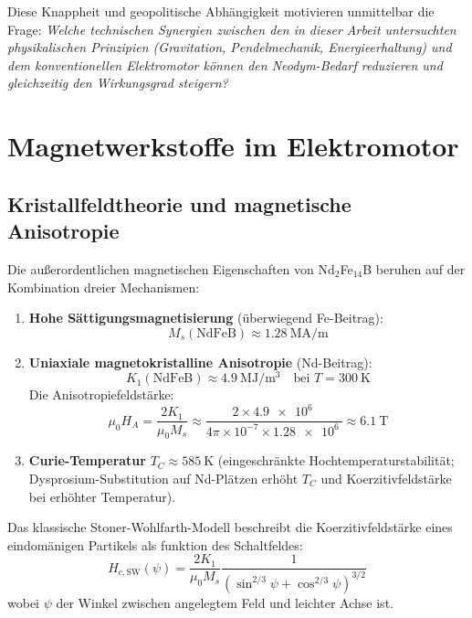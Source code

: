 ﻿\documentclass[12pt, a4paper]{report}
\theoremstyle{definition}
\theoremstyle{remark}
\begin{document}
Diese Knappheit und geopolitische Abhängigkeit motivieren unmittelbar die Frage:
\emph{Welche technischen Synergien zwischen den in dieser Arbeit untersuchten
physikalischen Prinzipien (Gravitation, Pendelmechanik, Energieerhaltung) und
dem konventionellen Elektromotor können den Neodym-Bedarf reduzieren und
gleichzeitig den Wirkungsgrad steigern?}

\section{Magnetwerkstoffe im Elektromotor}
\label{ssec:magnetwerkstoffe}

\subsection{Kristallfeldtheorie und magnetische Anisotropie}

Die außerordentlichen magnetischen Eigenschaften von Nd$_2$Fe$_{14}$B beruhen auf
der Kombination dreier Mechanismen:

\begin{enumerate}[leftmargin=2em, label=(\arabic*)]
  \item \textbf{Hohe Sättigungsmagnetisierung} (überwiegend Fe-Beitrag):
    \begin{equation}
      M_s(\text{NdFeB}) \approx \SI{1.28}{\mega\ampere\per\metre}
      \label{eq:Ms_ndfe}
    \end{equation}
  \item \textbf{Uniaxiale magnetokristalline Anisotropie} (Nd-Beitrag):
    \begin{equation}
      K_1(\text{NdFeB}) \approx \SI{4.9}{\mega\joule\per\cubic\metre}
      \quad \text{bei } T = \SI{300}{\kelvin}
      \label{eq:K1_ndfe}
    \end{equation}
    Die Anisotropiefeldstärke:
    \begin{equation}
      \mu_0 H_A = \frac{2K_1}{\mu_0 M_s}
      \approx \frac{2 \times \SI{4.9e6}{}}{4\pi \times 10^{-7} \times \SI{1.28e6}{}}
      \approx \SI{6.1}{\tesla}
      \label{eq:HA}
    \end{equation}
  \item \textbf{Curie-Temperatur} $T_C \approx \SI{585}{\kelvin}$ (eingeschränkte
    Hochtemperaturstabilität; Dyspro\-sium-Substitution auf Nd-Plätzen erhöht
    $T_C$ und Koerzitivfeldstärke bei erhöhter Temperatur).
\end{enumerate}

Das klassische Stoner-Wohlfarth-Modell beschreibt die Koerzitivfeldstärke eines
eindomänigen Partikels als funktion des Schaltfeldes:
\begin{equation}
  H_{c,\text{SW}}(\psi) = \frac{2K_1}{\mu_0 M_s}
    \frac{1}{(\sin^{2/3}\psi + \cos^{2/3}\psi)^{3/2}}
  \label{eq:stoner_wohlfarth}
\end{equation}
wobei $\psi$ der Winkel zwischen angelegtem Feld und leichter Achse ist.
\end{document}
